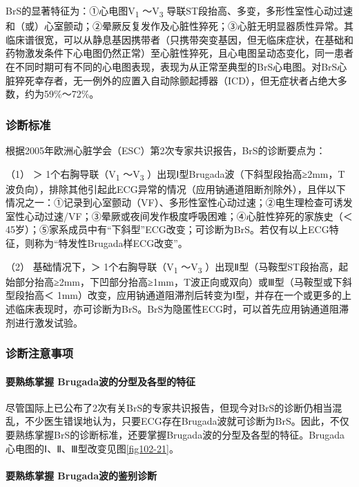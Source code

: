 BrS的显著特征为：①心电图V\textsubscript{1} ～V\textsubscript{3}
导联ST段抬高、多变，多形性室性心动过速和（或）心室颤动；②晕厥反复发作及心脏性猝死；③心脏无明显器质性异常。其临床谱很宽，可以从静息基因携带者（只携带突变基因，但无临床症状，在基础和药物激发条件下心电图仍然正常）至心脏性猝死，且心电图呈动态变化，同一患者在不同时期可有不同的心电图表现，表现为从正常至典型的BrS心电图。对BrS心脏猝死幸存者，无一例外的应置入自动除颤起搏器（ICD），但无症状者占绝大多数，约为59\%～72\%。

\subsubsection{诊断标准}

根据2005年欧洲心脏学会（ESC）第2次专家共识报告，BrS的诊断要点为：

（1） ＞ 1个右胸导联（V\textsubscript{1} ～V\textsubscript{3}
）出现Ⅰ型Brugada波（下斜型段抬高≥2mm，T波负向），排除其他引起此ECG异常的情况（应用钠通道阻断剂除外），且伴以下情况之一：①记录到心室颤动（VF）、多形性室性心动过速；②电生理检查可诱发室性心动过速/VF；③晕厥或夜间发作极度呼吸困难；④心脏性猝死的家族史（＜
45岁）；⑤家系成员中有“下斜型”ECG改变；可诊断为BrS。若仅有以上ECG特征，则称为“特发性Brugada样ECG改变”。

（2） 基础情况下，＞ 1个右胸导联（V\textsubscript{1}
～V\textsubscript{3}
）出现Ⅱ型（马鞍型ST段抬高，起始部分抬高≥2mm，下凹部分抬高≥1mm，T波正向或双向）或Ⅲ型（马鞍型或下斜型段抬高＜
1mm）改变，应用钠通道阻滞剂后转变为Ⅰ型，并存在一个或更多的上述临床表现时，亦可诊断为BrS。BrS为隐匿性ECG时，可以首先应用钠通道阻滞剂进行激发试验。

\subsubsection{诊断注意事项}

\paragraph{要熟练掌握 Brugada波的分型及各型的特征}

尽管国际上已公布了2次有关BrS的专家共识报告，但现今对BrS的诊断仍相当混乱，不少医生错误地认为，只要ECG存在Brugada波就可诊断为BrS。因此，不仅要熟练掌握BrS的诊断标准，还要掌握Brugada波的分型及各型的特征。Brugada心电图的Ⅰ、Ⅱ、Ⅲ型改变见图\ref{fig102-21}。

\paragraph{要熟练掌握 Brugada波的鉴别诊断}

